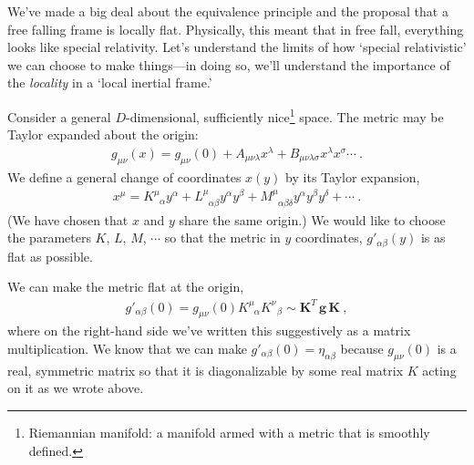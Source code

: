 \documentclass[12pt]{article}
\numberwithin{equation}{section}    %
\begin{document}
We've made a big deal about the equivalence principle and the proposal that a free falling frame is locally flat. Physically, this meant that in free fall, everything looks like special relativity. Let's understand the limits of how `special relativistic' we can choose to make things---in doing so, we'll understand the importance of the \emph{locality} in a `local inertial frame.'

Consider a general $D$-dimensional, sufficiently nice\footnote{Riemannian manifold: a manifold armed with a metric that is smoothly defined.} space. The metric may be Taylor expanded about the origin:
\begin{align}
	g_{\mu\nu}(x) = g_{\mu\nu}(0) + A_{\mu\nu\lambda} x^\lambda + B_{\mu\nu\lambda\sigma} x^\lambda x^\sigma \cdots \ .
\end{align}
We define a general change of coordinates $x(y)$ by its Taylor expansion, 
\begin{align}
	x^\mu = K^\mu_{\phantom{\mu} \alpha} y^\alpha
	+ L^\mu_{\phantom{\mu} \alpha\beta} y^\alpha y^\beta
	+ M^\mu_{\phantom{\mu} \alpha\beta\delta} y^\alpha y^\beta y^\delta
	+ \cdots \ .
\end{align}
(We have chosen that $x$ and $y$ share the same origin.)
We would like to choose the parameters $K$, $L$, $M$, $\cdots$ so that the metric in $y$ coordinates, $g'_{\alpha\beta}(y)$ is as flat as possible. 

We can make the metric flat at the origin, 
	\begin{align}
		g'_{\alpha\beta}(0) = g_{\mu\nu}(0) K^\mu_{\phantom{\mu} \alpha} K^\nu_{\phantom{\mu} \beta} \sim \mathbf{K}^T\, \mathbf{g} \, \mathbf{K} \ ,
	\end{align}
	where on the right-hand side we've written this suggestively as a matrix multiplication.
	We know that we can make $g'_{\alpha\beta}(0) = \eta_{\alpha\beta}$ because $g_{\mu\nu}(0)$ is a real, symmetric matrix so that it is diagonalizable by some real matrix $K$ acting on it as we wrote above.
\end{document}
